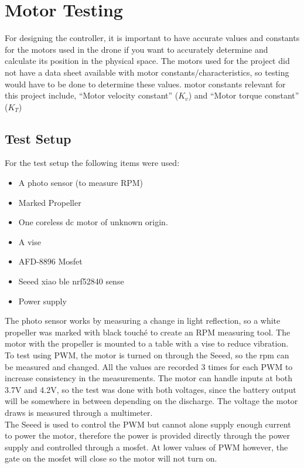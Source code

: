 \section{Motor Testing}\label{Motor Testing_Appendix}
For designing the controller, it is important to have accurate values and constants for the motors used in the drone if you want to accurately determine and calculate its position in the physical space. The motors used for the project did not have a data sheet available with motor constants/characteristics, so testing would have to be done to determine these values.  motor constants relevant for this project include, “Motor velocity constant” ($K_v$) and “Motor torque constant” ($K_T$)
\subsection{Test Setup}
For the test setup the following items were used:
\begin{itemize}
    \item A photo sensor (to measure RPM)
    \item Marked Propeller
    \item One coreless dc motor of unknown origin.
    \item A vise
    \item AFD-8896 Mosfet
    \item Seeed xiao ble nrf52840 sense 
    \item Power supply
\end{itemize}

The photo sensor works by measuring a change in light reflection, so a white propeller was marked with black touché to create an RPM measuring tool. The motor with the propeller is mounted to a table with a vise to reduce vibration.
To test using PWM, the motor is turned on through the Seeed, so the rpm can be measured and changed. All the values are recorded 3 times for each PWM to increase consistency in the measurements. The motor can handle inputs at both 3.7V and 4.2V, so the test was done with both voltages, since the battery output will be somewhere in between depending on the discharge. The voltage the motor draws is measured through a multimeter. \\

The Seeed is used to control the PWM but cannot alone supply enough current to power the motor, therefore the power is provided directly through the power supply and controlled through a mosfet. At lower values of PWM however, the gate on the mosfet will close so the motor will not turn on.

